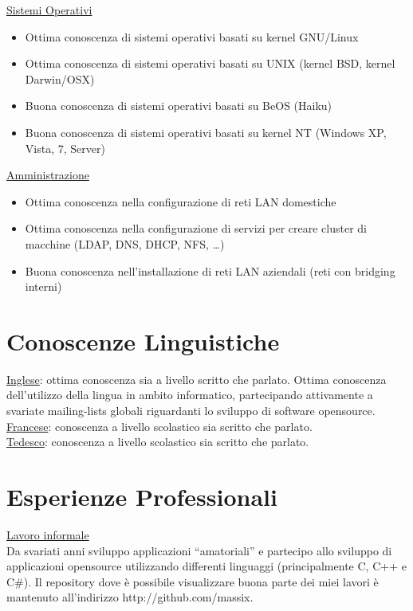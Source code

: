 \documentclass[margin]{res}
\begin{document}
\begin{resume}
	\underline{Sistemi Operativi}
		\begin{itemize}
			\item Ottima conoscenza di sistemi operativi basati su kernel GNU/Linux
			\item Ottima conoscenza di sistemi operativi basati su UNIX (kernel BSD, kernel Darwin/OSX)
			\item Buona conoscenza di sistemi operativi basati su BeOS (Haiku)
			\item Buona conoscenza di sistemi operativi basati su kernel NT (Windows XP, Vista, 7, Server)
		\end{itemize}
	
	\underline{Amministrazione}
		\begin{itemize}
			\item Ottima conoscenza nella configurazione di reti LAN domestiche
			\item Ottima conoscenza nella configurazione di servizi per creare cluster di
			macchine (LDAP, DNS, DHCP, NFS, \ldots)
			\item Buona conoscenza nell'installazione di reti LAN aziendali (reti con bridging interni)
		\end{itemize}

\section{Conoscenze Linguistiche} 
\underline{Inglese}: ottima conoscenza sia a livello scritto che parlato. Ottima
conoscenza dell'utilizzo della lingua in ambito informatico, partecipando attivamente
a svariate mailing-lists globali riguardanti lo sviluppo di software opensource. \\
\underline{Francese}: conoscenza a livello scolastico sia scritto che parlato. \\
\underline{Tedesco}: conoscenza a livello scolastico sia scritto che parlato. \\
 

\section{Esperienze Professionali}
\underline{Lavoro informale} \\
Da svariati anni sviluppo applicazioni ``amatoriali'' e partecipo allo sviluppo di applicazioni
opensource utilizzando differenti linguaggi (principalmente C, C++ e C\#). Il repository dove \`e
possibile visualizzare buona parte dei miei lavori \`e mantenuto all'indirizzo http://github.com/massix.


\end{resume}
\end{document}
